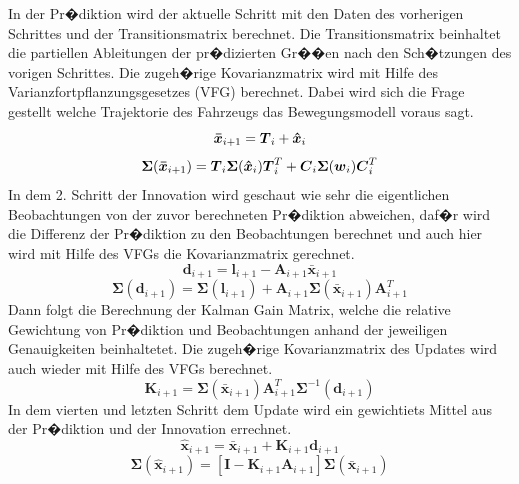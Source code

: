 In der Pr�diktion wird der aktuelle Schritt mit den Daten des vorherigen Schrittes und der Transitionsmatrix berechnet. Die Transitionsmatrix beinhaltet die partiellen Ableitungen der pr�dizierten Gr��en nach den Sch�tzungen des vorigen Schrittes. Die zugeh�rige Kovarianzmatrix wird mit Hilfe des Varianzfortpflanzungsgesetzes (VFG) berechnet. Dabei wird sich die Frage gestellt welche Trajektorie des Fahrzeugs das Bewegungsmodell voraus sagt. 
\begin{equation}
\boldsymbol{\bar{x}}_{i+1} = \boldsymbol{T}_i +\boldsymbol{\hat{x}}_{i}\\
\end{equation}
\begin{equation}
\boldsymbol{\Sigma}(\boldsymbol{\bar{x}}_{i+1}) = \boldsymbol{T}_i\boldsymbol{\Sigma}(\boldsymbol{\hat{x}}_{i})\boldsymbol{T}_i^T + \boldsymbol{C}_i\boldsymbol{\Sigma}(\boldsymbol{w}_{i})\boldsymbol{C}_i^T\\
\end{equation}
In dem 2. Schritt der Innovation wird geschaut wie sehr die eigentlichen Beobachtungen von der zuvor berechneten Pr�diktion abweichen, daf�r wird die Differenz der Pr�diktion zu den Beobachtungen berechnet und auch hier wird mit Hilfe des VFGs die Kovarianzmatrix gerechnet. 
\begin{equation}
\boldsymbol{d}_{i+1} = \boldsymbol{l}_{i+1} - \boldsymbol{A}_{i+1}\boldsymbol{\bar{x}}_{i+1}
\end{equation}
\begin{equation}
\boldsymbol{\Sigma}(\boldsymbol{d}_{i+1}) = \boldsymbol{\Sigma}(\boldsymbol{l}_{i+1}) + \boldsymbol{A}_{i+1}\boldsymbol{\Sigma}(\boldsymbol{\bar{x}}_{i+1})\boldsymbol{A}_{i+1}^T
\end{equation}
Dann folgt die Berechnung der Kalman Gain Matrix, welche die relative Gewichtung von Pr�diktion und Beobachtungen anhand der jeweiligen Genauigkeiten beinhaltetet. Die zugeh�rige Kovarianzmatrix des Updates wird auch wieder mit Hilfe des VFGs berechnet.
\begin{equation}
\boldsymbol{K}_{i+1} = \boldsymbol{\Sigma}(\boldsymbol{\bar{x}}_{i+1})\boldsymbol{A}_{i+1}^T\boldsymbol{\Sigma}^{-1}(\boldsymbol{d}_{i+1})
\end{equation}
In dem vierten und letzten Schritt dem Update wird ein gewichtiets Mittel aus der Pr�diktion und der Innovation errechnet.
\begin{equation}
\boldsymbol{\hat{x}}_{i+1} = \boldsymbol{\bar{x}}_{i+1} + \boldsymbol{K}_{i+1}\boldsymbol{d}_{i+1}
\end{equation}
\begin{equation}
\boldsymbol{\Sigma}(\boldsymbol{\hat{x}}_{i+1}) = [\boldsymbol{I}-\boldsymbol{K}_{i+1}\boldsymbol{A}_{i+1}]\boldsymbol{\Sigma}(\boldsymbol{\bar{x}}_{i+1})
\end{equation}

